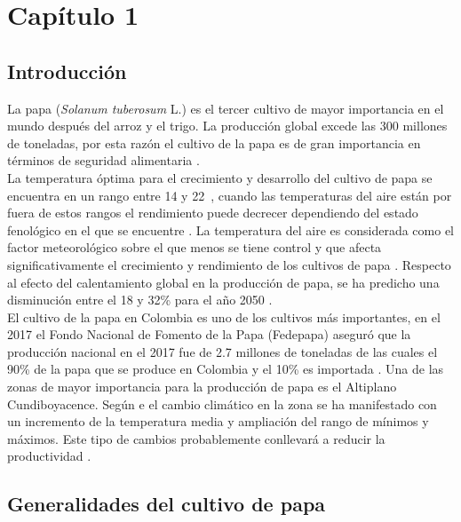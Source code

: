 
\chapter{Capítulo 1}
\section{Introducción}

La papa (\textit{Solanum tuberosum} L.) es el tercer cultivo de mayor importancia en el mundo después del arroz y el trigo. La producción global excede las 300 millones de toneladas, por esta razón el cultivo de la papa es de gran importancia en términos de seguridad alimentaria \citep{birch2012crops}.\\

La temperatura óptima para el crecimiento y desarrollo del cultivo de papa se encuentra en un rango entre 14 y 22\celc \ , cuando las temperaturas del aire están por fuera de estos rangos el rendimiento puede decrecer dependiendo del estado fenológico en el que se encuentre \citep{Hijmans2003}. La temperatura del aire es considerada como el factor meteorológico sobre el que menos se tiene control y que afecta significativamente el crecimiento y rendimiento de los cultivos de papa \citep{hancock2014physiological}. Respecto al efecto del calentamiento global en la producción de papa, se ha predicho una disminución entre el 18 y 32\% para el año 2050 \citep{hijmans2003effect}. \\

El cultivo de la papa en Colombia es uno de los cultivos más importantes, en el 2017 el Fondo Nacional de Fomento de la Papa (Fedepapa) aseguró que la producción nacional en el 2017 fue de 2.7 millones de toneladas de las  cuales el 90\% de la papa que se produce en Colombia y el 10\% es importada \citep{Portafolio2017}. Una de las zonas de mayor importancia para la producción de papa es el Altiplano Cundiboyacence. Según \citet{Barrientos2014} e \citet{IDEAM2009} el cambio climático en la zona se ha manifestado con un incremento de la temperatura media y ampliación del rango de mínimos y máximos. Este tipo de cambios probablemente conllevará a reducir la productividad \citep{Hatfield2015}.\\

\section{Generalidades del cultivo de papa}

